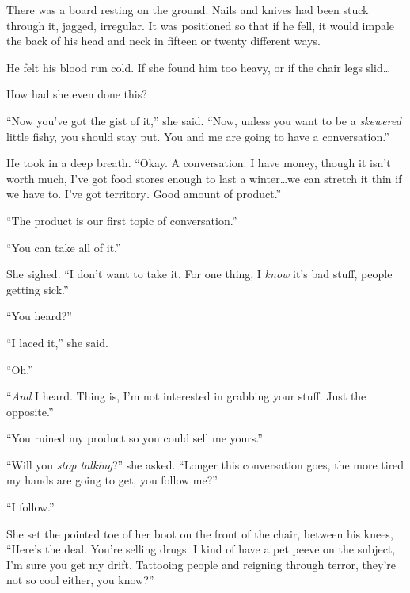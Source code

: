 There was a board resting on the ground.  Nails and knives had been stuck through it, jagged, irregular.  It was positioned so that if he fell, it would impale the back of his head and neck in fifteen or twenty different ways.



He felt his blood run cold.  If she found him too heavy, or if the chair legs slid\ldots



How had she even done this?



``Now you've got the gist of it,'' she said.  ``Now, unless you want to be a \emph{skewered} little fishy, you should stay put.  You and me are going to have a conversation.''



He took in a deep breath.  ``Okay.  A conversation.  I have money, though it isn't worth much, I've got food stores enough to last a winter\ldots we can stretch it thin if we have to.  I've got territory\emph{.  }Good amount of product.''



``The product is our first topic of conversation.''



``You can take all of it.''



She sighed.  ``I don't want to take it.  For one thing, I \emph{know} it's bad stuff, people getting sick.''



``You heard?''



``I laced it,'' she said.



``Oh.''



``\emph{And} I heard.  Thing is, I'm not interested in grabbing your stuff.  Just the opposite.''



``You ruined my product so you could sell me yours.''



``Will you \emph{stop talking}?'' she asked.  ``Longer this conversation goes, the more tired my hands are going to get, you follow me?''



``I follow.''



She set the pointed toe of her boot on the front of the chair, between his knees, ``Here's the deal.  You're selling drugs.  I kind of have a pet peeve on the subject, I'm sure you get my drift.  Tattooing people and reigning through terror, they're not so cool either, you know?''



